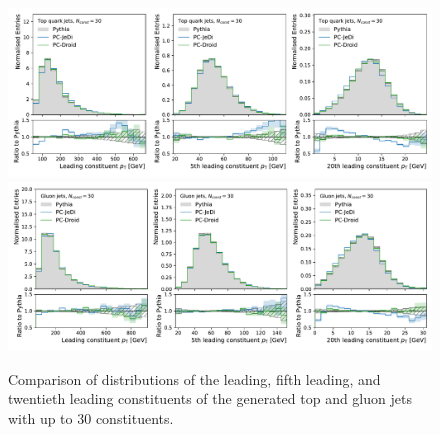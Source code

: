 \begin{figure}[htpb]
    \centering
    \includegraphics[width=0.99\linewidth]{Figures/jet_generation/droid/30/csts/t/100/t_leading_constituents.pdf} \\
    \includegraphics[width=0.99\linewidth]{Figures/jet_generation/droid/30/csts/g/100/g_leading_constituents.pdf}
    \caption{Comparison of \pt distributions of the leading, fifth leading, and twentieth leading constituents of the generated top and gluon jets with up to 30 constituents.}
    \label{fig:const-pt_dist-30}
\end{figure}


